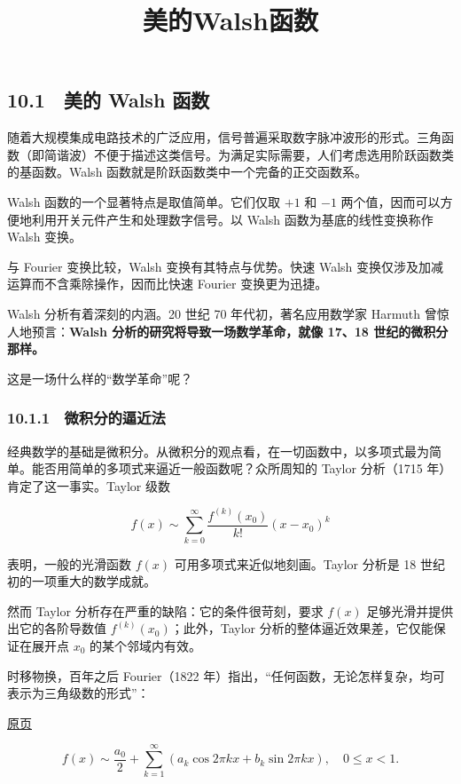 \documentclass[
  10pt,
  fontset=fandol]{ctexart}
\title{美的Walsh函数}
\author{}
\date{}
\begin{document}
\maketitle

\subsection{10.1　美的 Walsh 函数}\label{ux7f8eux7684-walsh-ux51fdux6570}

随着大规模集成电路技术的广泛应用，信号普遍采取数字脉冲波形的形式。三角函数（即简谐波）不便于描述这类信号。为满足实际需要，人们考虑选用阶跃函数类的基函数。Walsh 函数就是阶跃函数类中一个完备的正交函数系。

Walsh 函数的一个显著特点是取值简单。它们仅取 \(+1\) 和 \(-1\) 两个值，因而可以方便地利用开关元件产生和处理数字信号。以 Walsh 函数为基底的线性变换称作 Walsh 变换。

与 Fourier 变换比较，Walsh 变换有其特点与优势。快速 Walsh 变换仅涉及加减运算而不含乘除操作，因而比快速 Fourier 变换更为迅捷。

Walsh 分析有着深刻的内涵。20 世纪 70 年代初，著名应用数学家 Harmuth 曾惊人地预言：\textbf{Walsh 分析的研究将导致一场数学革命，就像 17、18 世纪的微积分那样。}

这是一场什么样的``数学革命''呢？

\subsubsection{10.1.1　微积分的逼近法}\label{ux5faeux79efux5206ux7684ux903cux8fd1ux6cd5}

经典数学的基础是微积分。从微积分的观点看，在一切函数中，以多项式最为简单。能否用简单的多项式来逼近一般函数呢？众所周知的 Taylor 分析（1715 年）肯定了这一事实。Taylor 级数

\[
f(x)\sim\sum_{k=0}^{\infty}\frac{f^{(k)}(x_0)}{k!}(x-x_0)^k
\]

表明，一般的光滑函数 \(f(x)\) 可用多项式来近似地刻画。Taylor 分析是 18 世纪初的一项重大的数学成就。

然而 Taylor 分析存在严重的缺陷：它的条件很苛刻，要求 \(f(x)\) 足够光滑并提供出它的各阶导数值 \(f^{(k)}(x_0)\)；此外，Taylor 分析的整体逼近效果差，它仅能保证在展开点 \(x_0\) 的某个邻域内有效。

时移物换，百年之后 Fourier（1822 年）指出，``任何函数，无论怎样复杂，均可表示为三角级数的形式''：

\href{../../source-images/pdf-262.jpeg}{原页}

\[
f(x)\sim\frac{a_0}{2}+\sum_{k=1}^{\infty}(a_k\cos2\pi kx+b_k\sin2\pi kx),\quad 0\leqslant x<1.
\]
\end{document}
